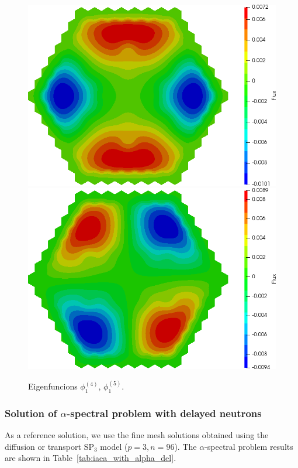 \documentclass[authoryear]{elsarticle}
\begin{document}
\begin{figure}[H]
\begin{center}
	\includegraphics[width=0.49\linewidth]{iaea_with/alpha_sp3_u1_4.png}
	\includegraphics[width=0.49\linewidth]{iaea_with/alpha_sp3_u1_5.png}\\
	\caption{Eigenfuncions $\phi_1^{(4)}$, $\phi_1^{(5)}$.}
	\label{fig:iaea_with_fun_3}
\end{center}
\end{figure}

\subsubsection{Solution of $\alpha$-spectral problem with delayed neutrons}

As a reference solution, we use the fine mesh solutions obtained using the diffusion or transport $\mathrm{SP_3}$ model ($ p = 3, n = 96 $). 
The $\alpha$-spectral problem results are shown in
Table~\ref{tab:iaea_with_alpha_del}.
\end{document}
